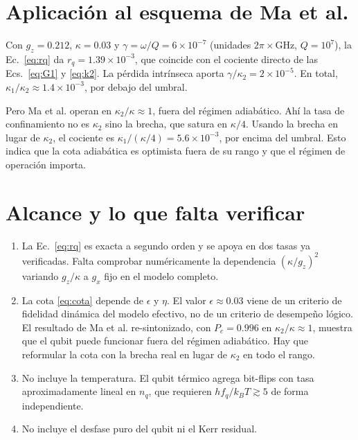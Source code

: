 \documentclass[11pt]{report}
\begin{document}
\section{Aplicaci\'on al esquema de Ma et al.}

Con $g_{z}=0.212$, $\kappa=0.03$ y $\gamma=\omega/Q=6\times10^{-7}$ (unidades $2\pi\times$GHz, $Q=10^{7}$), la Ec.~\eqref{eq:rq} da $r_{q}=1.39\times10^{-3}$, que coincide con el cociente directo de las Ecs.~\eqref{eq:G1} y \eqref{eq:k2}. La p\'erdida intr\'inseca aporta $\gamma/\kappa_{2}=2\times10^{-5}$. En total, $\kappa_{1}/\kappa_{2}\approx1.4\times10^{-3}$, por debajo del umbral.

Pero Ma et al. operan en $\kappa_{2}/\kappa\approx1$, fuera del r\'egimen adiab\'atico. Ah\'i la tasa de confinamiento no es $\kappa_{2}$ sino la brecha, que satura en $\kappa/4$. Usando la brecha en lugar de $\kappa_{2}$, el cociente es $\kappa_{1}/(\kappa/4)=5.6\times10^{-3}$, por encima del umbral. Esto indica que la cota adiab\'atica es optimista fuera de su rango y que el r\'egimen de operaci\'on importa.

\section{Alcance y lo que falta verificar}

\begin{enumerate}
\item La Ec.~\eqref{eq:rq} es exacta a segundo orden y se apoya en dos tasas ya verificadas. Falta comprobar num\'ericamente la dependencia $(\kappa/g_{z})^{2}$ variando $g_{z}/\kappa$ a $g_{x}$ fijo en el modelo completo.
\item La cota \eqref{eq:cota} depende de $\epsilon$ y $\eta$. El valor $\epsilon\approx0.03$ viene de un criterio de fidelidad din\'amica del modelo efectivo, no de un criterio de desempe\~no l\'ogico. El resultado de Ma et al. re-sintonizado, con $P_{c}=0.996$ en $\kappa_{2}/\kappa\approx1$, muestra que el qubit puede funcionar fuera del r\'egimen adiab\'atico. Hay que reformular la cota con la brecha real en lugar de $\kappa_{2}$ en todo el rango.
\item No incluye la temperatura. El qubit t\'ermico agrega bit-flips con tasa aproximadamente lineal en $n_{q}$, que requieren $hf_{q}/k_{B}T\gtrsim5$ de forma independiente.
\item No incluye el desfase puro del qubit ni el Kerr residual.
\end{enumerate}



\end{document}
